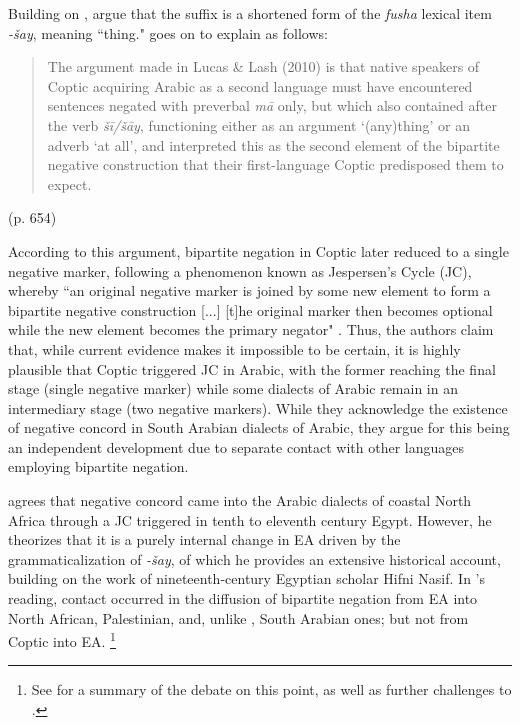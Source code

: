 \documentclass[12pt,a4paper]{article}
\begin{document}
Building on \textcite{diem_negation_2014}, \textcite{lucas_contact_2010} argue that the suffix is a shortened form of the \textit{fusha} lexical item \textit{-šay\textglotstop}, meaning ``thing." \textcite{lucas_contact_2020} goes on to explain as follows:

\begin{quote}
The argument made in Lucas \& Lash (2010) is that native speakers of Coptic acquiring Arabic as a second language must have encountered sentences negated with preverbal \textit{mā} only, but which also contained after the verb \textit{šī/šāy}, functioning either as an argument ‘(any)thing’ or an adverb ‘at all’, and interpreted this as the second element of the bipartite negative construction that their first-language Coptic predisposed them to expect.
\end{quote}
\begin{flushright}
(p. 654)
\end{flushright}

According to this argument, bipartite negation in Coptic later reduced to a single negative marker, following a phenomenon known as Jespersen’s Cycle (JC), whereby ``an original negative marker is joined by some new element to form a bipartite negative construction [...] [t]he original marker then becomes optional while the new element becomes the primary negator" \parencite[379]{lucas_contact_2010}. Thus, the authors claim that, while current evidence makes it impossible to be certain, it is highly plausible that Coptic triggered JC in Arabic, with the former reaching the final stage (single negative marker) while some dialects of Arabic remain in an intermediary stage (two negative markers). While they acknowledge the existence of negative concord in South Arabian dialects of Arabic, they argue for this being an independent development due to separate contact with other languages employing bipartite negation. 

\textcite{diem_negation_2014} agrees that negative concord came into the Arabic dialects of coastal North Africa through a JC triggered in tenth to eleventh century Egypt. However, he theorizes that it is a purely internal change in EA driven by the grammaticalization of \textit{-šay\textglotstop}, of which he provides an extensive historical account, building on the work of nineteenth-century Egyptian scholar Hifni Nasif. In \textcite{diem_negation_2014}'s reading, contact occurred in the diffusion of bipartite negation from EA into North African, Palestinian, and, unlike \textcite{lucas_contact_2010}, South Arabian ones; but not from Coptic into EA. \footnote{See \textcite{lucas_typology_2022} for a summary of the debate on this point, as well as further challenges to \textcite{diem_negation_2014}.}
\end{document}
